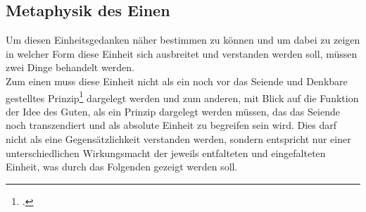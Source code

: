 \subsection{Metaphysik des Einen}
Um diesen Einheitsgedanken näher bestimmen zu können und um dabei zu zeigen in welcher Form diese Einheit sich ausbreitet und verstanden werden soll, müssen zwei Dinge behandelt werden.\\
Zum einen muss diese Einheit nicht als ein noch vor das Seiende und Denkbare gestelltes Prinzip\footcite[vgl.][S.99]{halfwassen2015spuren} dargelegt werden und zum anderen, mit Blick auf die Funktion der Idee des Guten, als ein Prinzip dargelegt werden müssen, das das Seiende noch transzendiert und als absolute Einheit zu begreifen sein wird. Dies darf nicht als eine Gegensätzlichkeit verstanden werden, sondern entspricht nur einer unterschiedlichen Wirkungsmacht der jeweils entfalteten und eingefalteten Einheit, was durch das Folgenden gezeigt werden soll.
